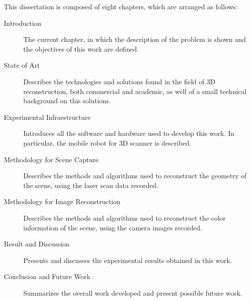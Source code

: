 This dissertation is composed of eight chapters, which are arranged as follows:

\begin{description}
    \item[Introduction] The current chapter, in which the description of the problem is shown and the objectives of this work are defined.
    \item[State of Art] Describes the technologies and solutions found in the field of 3D reconstruction, both commercial and academic, as well of a small technical background on this solutions.
    \item[Experimental Infraestructure] Introduces all the software and hardware used to develop this work. In particular, the mobile robot for 3D scanner is described.
    \item[Methodology for Scene Capture] Describes the methods and algorithms used to reconstruct the geometry of the scene, using the laser scan data recorded.
    \item[Methodology for Image Reconstruction] Describes the methods and algorithms used to reconstruct the color information of the scene, using the camera images recorded.
    \item[Result and Discussion] Presents and discusses the experimental results obtained in this work.
    \item[Conclusion and Future Work] Summarizes the overall work developed and present possible future work.
\end{description}